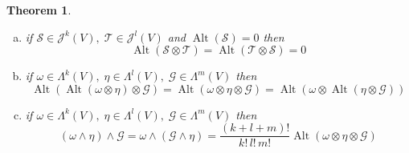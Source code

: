 \documentclass[12pt]{article}
\def\maj{\mathcal{J}}
\def\mat{\mathcal{T}}
\def\mas{\mathcal{S}}
\DeclareMathOperator{\alt}{Alt}
\newtheorem{theorem}{Theorem}[section]
\begin{document}
\begin{theorem}\quad \\
\begin{enumerate}[(a)]
\item if $\mas \in \maj^k(V), \; \mat \in \maj^l(V)$ and $\alt(\mas)=0$ then 
\[\alt(\mas\otimes\mat) = \alt(\mat\otimes\mas)=0\]
\item if $\omega \in \Lambda^k(V), \; \eta \in \Lambda^l(V), \; \mathcal{G} \in \Lambda^m(V)$ then
\[\alt(\alt(\omega\otimes\eta)\otimes\mathcal{G}) = \alt(\omega\otimes\eta\otimes\mathcal{G}) = \alt(\omega\otimes\alt(\eta\otimes\mathcal{G}) )\]
\item  if $\omega \in \Lambda^k(V), \; \eta \in \Lambda^l(V), \; \mathcal{G} \in \Lambda^m(V)$ then
\[(\omega\wedge\eta)\wedge\mathcal{G} = \omega\wedge(\mathcal{G}\wedge\eta) = \frac{(k+l+m)!}{k!\,l!\,m!}\alt(\omega\otimes\eta\otimes\mathcal{G})\]
\end{enumerate}


\end{theorem}
\end{document}

